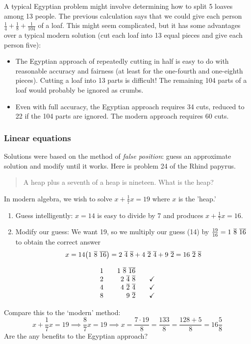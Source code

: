 A typical Egyptian problem might involve determining how to split 5 loaves among 13 people. The previous calculation says that we could give each person $\frac 14+\frac 18+\frac 1{104}$ of a loaf. This might seem complicated, but it has some advantages over a typical modern solution (cut each loaf into 13 equal pieces and give each person five):
\begin{itemize}
  \item The Egyptian approach of repeatedly cutting in half is easy to do with reasonable accuracy and fairness (at least for the one-fourth and one-eighth pieces). Cutting a loaf into 13\th{} parts is difficult! The remaining 104\th{} parts of a loaf would probably be ignored as crumbs.
  \item Even with full accuracy, the Egyptian approach requires 34 cuts, reduced to 22 if the 104\th{} parts are ignored. The modern approach requires 60 cuts.
\end{itemize}


\pagebreak[3]


\subsubsection*{Linear equations}

Solutions were based on the method of \emph{false position}: guess an approximate solution and modify until it works. Here is problem 24 of the Rhind papyrus.
\begin{quote}
	A heap plus a seventh of a heap is nineteen. What is the heap?
\end{quote}
In modern algebra, we wish to solve $x+\frac 17x=19$ where $x$ is the 'heap.'\par
\begin{minipage}[t]{0.69\linewidth}\vspace{0pt}
	\begin{enumerate}
  	\item Guess intelligently: $x=14$ is easy to divide by 7 and produces $x+\frac 17 x=16$.
  	\item Modify our guess: We want 19, so we multiply our guess (14) by $\frac{19}{16}=1\ \overline{8}\ \overline{16}$ to obtain the correct answer
  	\[
  		x=14\big(1\ \cl 8\ \cl{16}\big) =2\ \cl 4\ \cl 8 +4\ \cl 2\ \cl 4+ 9\ \cl 2 =16\ \cl 2\ \cl 8
  	\]
	\end{enumerate}
\end{minipage}
\hfill
\begin{minipage}[t]{0.3\linewidth}\vspace{25pt}
	\hfill 
	\[
		\begin{array}{r@{\qquad}r@{\qquad}c}
			1&1\ \cl 8\ \cl{16}\\
			2&2\ \cl 4\ \cl 8&\checkmark\\
			4&4\ \cl 2\ \cl 4&\checkmark\\
			8&9\ \cl 2&\checkmark
		\end{array}
	\]
\end{minipage}\par
Compare this to the `modern' method:
\[
	x+\frac 17x=19\implies \frac 87x=19\implies x=\frac{7\cdot 19}8 =\frac{133}8 =\frac{128+5}8= 16\frac 58
\]
Are the any benefits to the Egyptian approach?


